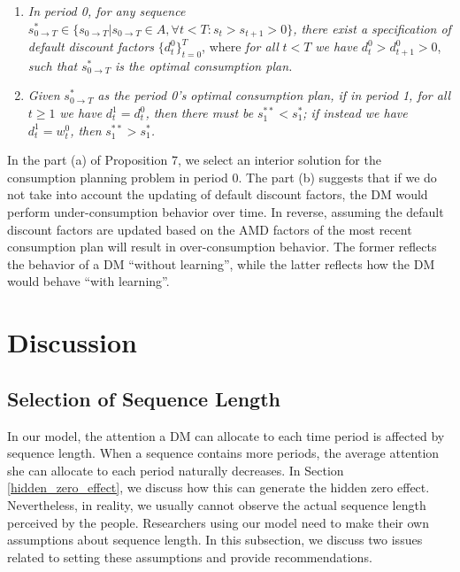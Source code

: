 \documentclass[
  12pt,
]{article}
\begin{document}
\begin{enumerate}
\def\labelenumi{(\alph{enumi})}
\item
  \emph{In period 0, for any sequence}
  \(s_{0\rightarrow T}^*\in \{s_{0\rightarrow T}|s_{0\rightarrow T}\in A,\forall t<T:s_t>s_{t+1}>0\}\)\emph{,
  there exist a specification of default discount factors}
  \(\{d_t^0\}_{t=0}^T\), where \emph{for all} \(t<T\) \emph{we have}
  \(d_t^0 >d_{t+1}^0>0\), \emph{such that} \(s_{0\rightarrow T}^*\)
  \emph{is the optimal consumption plan.}
\item
  \emph{Given} \(s_{0\rightarrow T}^*\) \emph{as the period 0's optimal
  consumption plan, if in period 1, for all} \(t\geq 1\) \emph{we have}
  \(d_t^1=d_t^0\)\emph{, then there must be} \(s_1^{**}< s_1^*\)\emph{;
  if instead we have} \(d_t^1=w_t^0\)\emph{, then}
  \(s_1^{**}> s_1^*\)\emph{.}
\end{enumerate}

In the part (a) of Proposition 7, we select an interior solution for the
consumption planning problem in period 0. The part (b) suggests that if
we do not take into account the updating of default discount factors,
the DM would perform under-consumption behavior over time. In reverse,
assuming the default discount factors are updated based on the AMD
factors of the most recent consumption plan will result in
over-consumption behavior. The former reflects the behavior of a DM
``without learning'', while the latter reflects how the DM would behave
``with learning''.

\hypertarget{discussion}{%
\section{Discussion}\label{discussion}}

\hypertarget{selection-of-sequence-length}{%
\subsection{Selection of Sequence
Length}\label{selection-of-sequence-length}}

In our model, the attention a DM can allocate to each time period is
affected by sequence length. When a sequence contains more periods, the
average attention she can allocate to each period naturally decreases.
In Section \ref{hidden_zero_effect}, we discuss how this can generate
the hidden zero effect. Nevertheless, in reality, we usually cannot
observe the actual sequence length perceived by the people. Researchers
using our model need to make their own assumptions about sequence
length. In this subsection, we discuss two issues related to setting
these assumptions and provide recommendations.
\end{document}

